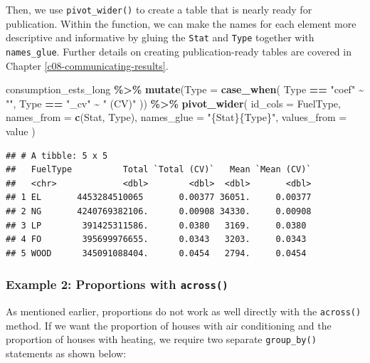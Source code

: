 \documentclass[
]{krantz}
\makeatletter
\newenvironment{Shaded}{\begin{snugshade}}{\end{snugshade}}
\newcommand{\AttributeTok}[1]{\textcolor[rgb]{0.27,0.27,0.27}{#1}}
\newcommand{\FunctionTok}[1]{\textcolor[rgb]{0.27,0.27,0.27}{\textbf{#1}}}
\newcommand{\NormalTok}[1]{#1}
\newcommand{\SpecialCharTok}[1]{\textcolor[rgb]{0.43,0.43,0.43}{\textbf{#1}}}
\newcommand{\StringTok}[1]{\textcolor[rgb]{0.5,0.5,0.5}{#1}}
\newenvironment{kframe}{%
\medskip{}
\setlength{\fboxsep}{.8em}
 \def\at@end@of@kframe{}%
 \ifinner\ifhmode%
  \def\at@end@of@kframe{\end{minipage}}%
  \begin{minipage}{\columnwidth}%
 \fi\fi%
 \def\FrameCommand##1{\hskip\@totalleftmargin \hskip-\fboxsep
 \colorbox{shadecolor}{##1}\hskip-\fboxsep
     \hskip-\linewidth \hskip-\@totalleftmargin \hskip\columnwidth}%
 \MakeFramed {\advance\hsize-\width
   \@totalleftmargin\z@ \linewidth\hsize
   \@setminipage}}%
 {\par\unskip\endMakeFramed%
 \at@end@of@kframe}
\renewenvironment{Shaded}{\begin{kframe}}{\end{kframe}}
\makeatother
\begin{document}
Then, we use \texttt{pivot\_wider()} to create a table that is nearly ready for publication. Within the function, we can make the names for each element more descriptive and informative by gluing the \texttt{Stat} and \texttt{Type} together with \texttt{names\_glue}. Further details on creating publication-ready tables are covered in Chapter \ref{c08-communicating-results}.

\begin{Shaded}
\begin{Highlighting}[]
\NormalTok{consumption\_ests\_long }\SpecialCharTok{\%\textgreater{}\%}
  \FunctionTok{mutate}\NormalTok{(}\AttributeTok{Type =} \FunctionTok{case\_when}\NormalTok{(}
\NormalTok{    Type }\SpecialCharTok{==} \StringTok{"coef"} \SpecialCharTok{\textasciitilde{}} \StringTok{""}\NormalTok{,}
\NormalTok{    Type }\SpecialCharTok{==} \StringTok{"\_cv"} \SpecialCharTok{\textasciitilde{}} \StringTok{" (CV)"}
\NormalTok{  )) }\SpecialCharTok{\%\textgreater{}\%}
  \FunctionTok{pivot\_wider}\NormalTok{(}
    \AttributeTok{id\_cols =}\NormalTok{ FuelType,}
    \AttributeTok{names\_from =} \FunctionTok{c}\NormalTok{(Stat, Type),}
    \AttributeTok{names\_glue =} \StringTok{"\{Stat\}\{Type\}"}\NormalTok{,}
    \AttributeTok{values\_from =}\NormalTok{ value}
\NormalTok{  )}
\end{Highlighting}
\end{Shaded}

\begin{verbatim}
## # A tibble: 5 x 5
##   FuelType          Total `Total (CV)`   Mean `Mean (CV)`
##   <chr>             <dbl>        <dbl>  <dbl>       <dbl>
## 1 EL       4453284510065       0.00377 36051.     0.00377
## 2 NG       4240769382106.      0.00908 34330.     0.00908
## 3 LP        391425311586.      0.0380   3169.     0.0380 
## 4 FO        395699976655.      0.0343   3203.     0.0343 
## 5 WOOD      345091088404.      0.0454   2794.     0.0454
\end{verbatim}

\hypertarget{example-2-proportions-with-across}{%
\subsubsection*{\texorpdfstring{Example 2: Proportions with \texttt{across()}}{Example 2: Proportions with across()}}\label{example-2-proportions-with-across}}


As mentioned earlier, proportions do not work as well directly with the \texttt{across()} method. If we want the proportion of houses with air conditioning and the proportion of houses with heating, we require two separate \texttt{group\_by()} statements as shown below:
\end{document}
